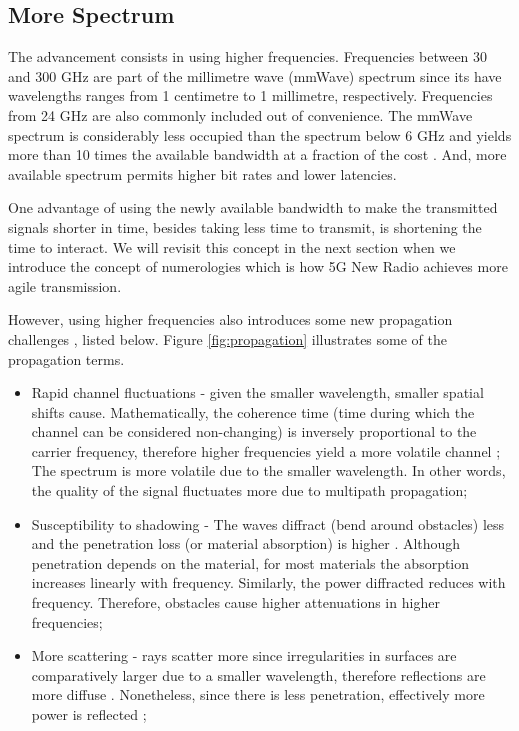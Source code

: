 \subsection*{More Spectrum}

The advancement consists in using higher frequencies. Frequencies between 30 and 300 GHz are part of the millimetre wave (mmWave) spectrum since its have wavelengths ranges from 1 centimetre to 1 millimetre, respectively. Frequencies from 24 GHz are also commonly included out of convenience. The mmWave spectrum is considerably less occupied than the spectrum below 6 GHz and yields more than 10 times the available bandwidth at a fraction of the cost \cite{spectrum_price}. And, more available spectrum permits higher bit rates and lower latencies. %


One advantage of using the newly available bandwidth to make the transmitted signals shorter in time, besides taking less time to transmit, is shortening the time to interact. We will revisit this concept in the next section when we introduce the concept of numerologies which is how 5G New Radio achieves more agile transmission.

However, using higher frequencies also introduces some new propagation challenges \cite{rappaport_potentials_and_challenges, it_will_work}, listed below. Figure \ref{fig:propagation} illustrates some of the propagation terms.

\begin{itemize}
    \item Rapid channel fluctuations - given the smaller wavelength, smaller spatial shifts cause. Mathematically, the coherence time (time during which the channel can be considered non-changing) is inversely proportional to the carrier frequency, therefore higher frequencies yield a more volatile channel \cite{Rappaport_wireless_coms};
    The spectrum is more volatile due to the smaller wavelength. In other words, the quality of the signal fluctuates more due to multipath propagation;
    \item Susceptibility to shadowing - The waves diffract (bend around obstacles) less and the penetration loss (or material absorption) is higher \cite{Rappaport_wireless_coms}. Although penetration depends on the material, for most materials the absorption increases linearly with frequency. Similarly, the power diffracted reduces with frequency. Therefore, obstacles cause higher attenuations in higher frequencies;
    \item More scattering - rays scatter more since irregularities in surfaces are comparatively larger due to a smaller wavelength, therefore reflections are more diffuse \cite{Rappaport_wireless_coms}. Nonetheless, since there is less penetration, effectively more power is reflected \cite{more_reflection};
\end{itemize}

